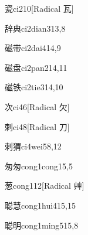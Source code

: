 \begin{verbete}{瓷}{ci2}{10}[Radical ⽡]
\end{verbete}

\begin{verbete}{辞典}{ci2dian3}{13,8}
\end{verbete}

\begin{verbete}{磁带}{ci2dai4}{14,9}
\end{verbete}

\begin{verbete}{磁盘}{ci2pan2}{14,11}
\end{verbete}

\begin{verbete}{磁铁}{ci2tie3}{14,10}
\end{verbete}

\begin{verbete}{次}{ci4}{6}[Radical ⽋]
\end{verbete}

\begin{verbete}{刺}{ci4}{8}[Radical 刀]
\end{verbete}

\begin{verbete}{刺猬}{ci4wei5}{8,12}
\end{verbete}

\begin{verbete}{匆匆}{cong1cong1}{5,5}
\end{verbete}

\begin{verbete}{葱}{cong1}{12}[Radical 艸]
\end{verbete}

\begin{verbete}{聪慧}{cong1hui4}{15,15}
\end{verbete}

\begin{verbete}{聪明}{cong1ming5}{15,8}
\end{verbete}

